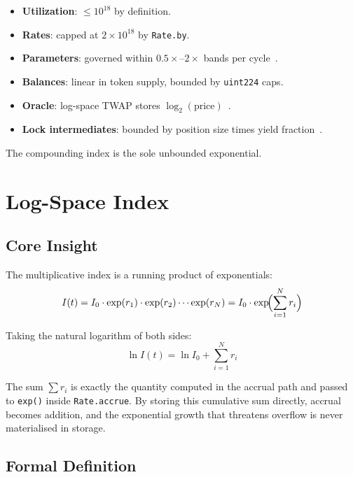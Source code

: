 \documentclass[10pt,a4paper,twocolumn]{article}
\begin{document}
\begin{itemize}[leftmargin=*, nosep]
\item \textbf{Utilization}: $\leq 10^{18}$ by definition.
\item \textbf{Rates}: capped at $2 \times 10^{18}$ by \texttt{Rate.by}.
\item \textbf{Parameters}: governed within $0.5\times$--$2\times$ bands per cycle~\cite{wp}.
\item \textbf{Balances}: linear in token supply, bounded by \texttt{uint224} caps.
\item \textbf{Oracle}: log-space TWAP stores $\log_2(\text{price})$~\cite{wp}.
\item \textbf{Lock intermediates}: bounded by position size times yield fraction~\cite{lck}.
\end{itemize}

The compounding index is the sole unbounded exponential.

\section{Log-Space Index}
\label{sec:logindex}

\subsection{Core Insight}
\label{subsec:insight}

The multiplicative index is a running product of exponentials:
\begin{equation}
\label{eq:product}
I(t) = I_0 \cdot \exp(r_1) \cdot \exp(r_2) \cdots \exp(r_N) = I_0 \cdot \exp\!\Bigl(\sum_{i=1}^N r_i\Bigr)
\end{equation}

Taking the natural logarithm of both sides:
\begin{equation}
\label{eq:log-product}
\ln I(t) = \ln I_0 + \sum_{i=1}^N r_i
\end{equation}

The sum $\sum r_i$ is exactly the quantity computed in the accrual path and passed to \texttt{exp()} inside \texttt{Rate.accrue}. By storing this cumulative sum directly, accrual becomes addition, and the exponential growth that threatens overflow is never materialised in storage.

\subsection{Formal Definition}
\label{subsec:formal}
\end{document}
